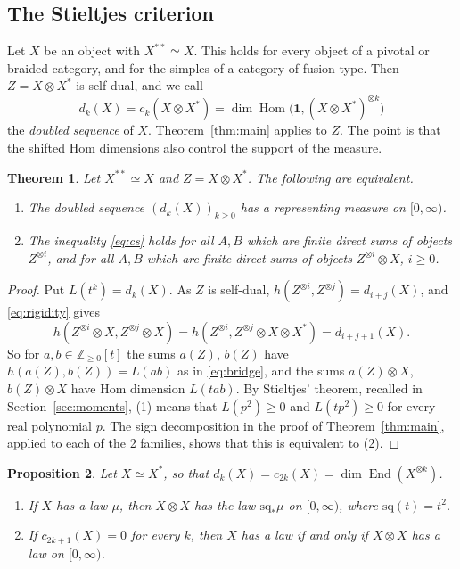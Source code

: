\documentclass[11pt,reqno]{amsart}
\newtheorem{theorem}{Theorem}[section]
\newtheorem{proposition}[theorem]{Proposition}
\theoremstyle{definition}
\newcommand{\Hom}{\operatorname{Hom}}
\newcommand{\End}{\operatorname{End}}
\newcommand{\one}{\mathbf 1}
\newcommand{\ZZ}{\mathbb Z}
\begin{document}
\subsection{The Stieltjes criterion}
Let $X$ be an object with $X^{**}\simeq X$. This holds for every object of a pivotal or braided category, and for the simples of a category of fusion type. Then $Z=X\otimes X^*$ is self-dual, and we call
\[
        d_k(X)=c_k(X\otimes X^*)=\dim\Hom\bigl(\one,(X\otimes X^*)^{\otimes k}\bigr)
\]
the \emph{doubled sequence} of $X$. Theorem~\ref{thm:main} applies to $Z$. The point is that the shifted Hom dimensions also control the support of the measure.

\begin{theorem}\label{thm:stieltjes}
Let $X^{**}\simeq X$ and $Z=X\otimes X^*$. The following are equivalent.
\begin{enumerate}
\item The doubled sequence $(d_k(X))_{k\geq0}$ has a representing measure on $[0,\infty)$.
\item The inequality \eqref{eq:cs} holds for all $A,B$ which are finite direct sums of objects $Z^{\otimes i}$, and for all $A,B$ which are finite direct sums of objects $Z^{\otimes i}\otimes X$, $i\geq0$.
\end{enumerate}
\end{theorem}

\begin{proof}
Put $L(t^k)=d_k(X)$. As $Z$ is self-dual, $h(Z^{\otimes i},Z^{\otimes j})=d_{i+j}(X)$, and \eqref{eq:rigidity} gives
\[
 h(Z^{\otimes i}\otimes X,Z^{\otimes j}\otimes X)=h(Z^{\otimes i},Z^{\otimes j}\otimes X\otimes X^*)=d_{i+j+1}(X).
\]
So for $a,b\in\ZZ_{\geq0}[t]$ the sums $a(Z)$, $b(Z)$ have $h(a(Z),b(Z))=L(ab)$ as in \eqref{eq:bridge}, and the sums $a(Z)\otimes X$, $b(Z)\otimes X$ have Hom dimension $L(tab)$. By Stieltjes' theorem, recalled in Section~\ref{sec:moments}, (1) means that $L(p^2)\geq0$ and $L(tp^2)\geq0$ for every real polynomial $p$. The sign decomposition in the proof of Theorem~\ref{thm:main}, applied to each of the 2 families, shows that this is equivalent to (2).
\end{proof}

\begin{proposition}\label{prop:doubling}
Let $X\simeq X^*$, so that $d_k(X)=c_{2k}(X)=\dim\End(X^{\otimes k})$.
\begin{enumerate}
\item If $X$ has a law $\mu$, then $X\otimes X$ has the law $\mathrm{sq}_*\mu$ on $[0,\infty)$, where $\mathrm{sq}(t)=t^2$.
\item If $c_{2k+1}(X)=0$ for every $k$, then $X$ has a law if and only if $X\otimes X$ has a law on $[0,\infty)$.
\end{enumerate}
\end{proposition}
\end{document}
